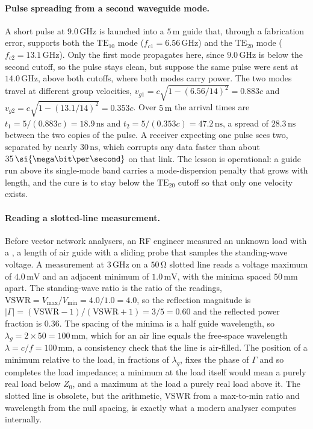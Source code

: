 \paragraph{Pulse spreading from a second waveguide mode.}
A short pulse at $9.0\,\si{\giga\hertz}$ is launched into a $5\,\si{
\meter}$ guide that, through a fabrication error, supports both the
$\text{TE}_{10}$ mode ($f_{c1} = 6.56\,\si{\giga\hertz}$) and the
$\text{TE}_{20}$ mode ($f_{c2} = 13.1\,\si{\giga\hertz}$). Only the first
mode propagates here, since $9.0\,\si{\giga\hertz}$ is below the second
cutoff, so the pulse stays clean, but suppose the same pulse were sent at
$14.0\,\si{\giga\hertz}$, above both cutoffs, where both modes carry
power. The two modes travel at different group velocities, $v_{g1} =
c\sqrt{1-(6.56/14)^2} = 0.883c$ and $v_{g2} = c\sqrt{1-(13.1/14)^2} =
0.353c$. Over $5\,\si{\meter}$ the arrival times are $t_1 = 5/(0.883c) =
18.9\,\si{\nano\second}$ and $t_2 = 5/(0.353c) = 47.2\,\si{\nano\second}$,
a spread of $28.3\,\si{\nano\second}$ between the two copies of the pulse.
A receiver expecting one pulse sees two, separated by nearly $30\,\si{
\nano\second}$, which corrupts any data faster than about $35\,\si{\mega
\bit\per\second}$ on that link. The lesson is operational: a guide run
above its single-mode band carries a mode-dispersion penalty that grows
with length, and the cure is to stay below the $\text{TE}_{20}$ cutoff so
that only one velocity exists.

\paragraph{Reading a slotted-line measurement.}
Before vector network analysers, an RF engineer measured an unknown load
with a , a length of air guide with a sliding probe
that samples the standing-wave voltage. A measurement at $3\,\si{\giga
\hertz}$ on a $50\,\si{\ohm}$ slotted line reads a voltage maximum of
$4.0\,\si{\milli\volt}$ and an adjacent minimum of $1.0\,\si{\milli
\volt}$, with the minima spaced $50\,\si{\milli\meter}$ apart. The
standing-wave ratio is the ratio of the readings, $\text{VSWR} = V_{\max}/
V_{\min} = 4.0/1.0 = 4.0$, so the reflection magnitude is $|\Gamma| =
(\text{VSWR}-1)/(\text{VSWR}+1) = 3/5 = 0.60$ and the reflected power
fraction is $0.36$. The spacing of the minima is a half guide wavelength,
so $\lambda_g = 2\times 50 = 100\,\si{\milli\meter}$, which for an air
line equals the free-space wavelength $\lambda = c/f = 100\,\si{\milli
\meter}$, a consistency check that the line is air-filled. The position of
a minimum relative to the load, in fractions of $\lambda_g$, fixes the
phase of $\Gamma$ and so completes the load impedance; a minimum at the
load itself would mean a purely real load below $Z_0$, and a maximum at
the load a purely real load above it. The slotted line is obsolete, but
the arithmetic, VSWR from a max-to-min ratio and wavelength from the null
spacing, is exactly what a modern analyser computes internally.

